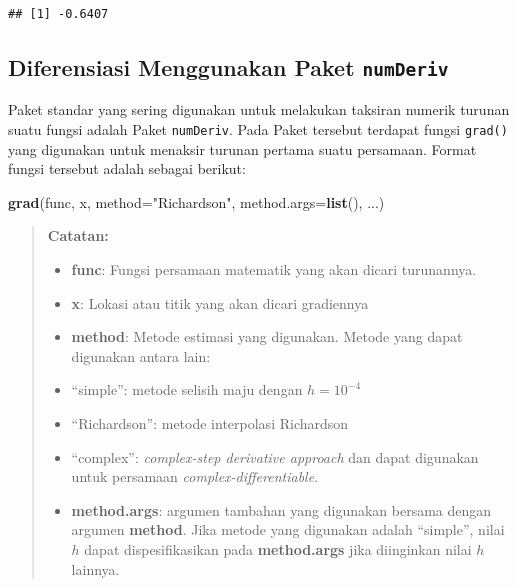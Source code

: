 \documentclass[
]{book}
\newenvironment{Shaded}{\begin{snugshade}}{\end{snugshade}}
\newcommand{\AttributeTok}[1]{\textcolor[rgb]{0.13,0.29,0.53}{#1}}
\newcommand{\FunctionTok}[1]{\textcolor[rgb]{0.13,0.29,0.53}{\textbf{#1}}}
\newcommand{\NormalTok}[1]{#1}
\newcommand{\StringTok}[1]{\textcolor[rgb]{0.31,0.60,0.02}{#1}}
\providecommand{\tightlist}{%
  \setlength{\itemsep}{0pt}\setlength{\parskip}{0pt}}
\theoremstyle{definition}
\theoremstyle{definition}
\theoremstyle{definition}
\theoremstyle{definition}
\theoremstyle{remark}
\begin{document}
\begin{verbatim}
## [1] -0.6407
\end{verbatim}

\hypertarget{diferensiasi-menggunakan-paket-numderiv}{%
\subsection{\texorpdfstring{Diferensiasi Menggunakan Paket \texttt{numDeriv}}{Diferensiasi Menggunakan Paket numDeriv}}\label{diferensiasi-menggunakan-paket-numderiv}}

Paket standar yang sering digunakan untuk melakukan taksiran numerik turunan suatu fungsi adalah Paket \texttt{numDeriv}. Pada Paket tersebut terdapat fungsi \texttt{grad()} yang digunakan untuk menaksir turunan pertama suatu persamaan. Format fungsi tersebut adalah sebagai berikut:

\begin{Shaded}
\begin{Highlighting}[]
\FunctionTok{grad}\NormalTok{(func, x, }\AttributeTok{method=}\StringTok{"Richardson"}\NormalTok{, }\AttributeTok{method.args=}\FunctionTok{list}\NormalTok{(), ...)}
\end{Highlighting}
\end{Shaded}

\begin{quote}
\textbf{Catatan:}

\begin{itemize}
\tightlist
\item
  \textbf{func}: Fungsi persamaan matematik yang akan dicari turunannya.
\item
  \textbf{x}: Lokasi atau titik yang akan dicari gradiennya
\item
  \textbf{method}: Metode estimasi yang digunakan. Metode yang dapat digunakan antara lain:
\item
  ``simple'': metode selisih maju dengan \(h = 10^{-4}\)
\item
  ``Richardson'': metode interpolasi Richardson
\item
  ``complex'': \emph{complex-step derivative approach} dan dapat digunakan untuk persamaan \emph{complex-differentiable}.
\item
  \textbf{method.args}: argumen tambahan yang digunakan bersama dengan argumen \textbf{method}. Jika metode yang digunakan adalah ``simple'', nilai \(h\) dapat dispesifikasikan pada \textbf{method.args} jika diinginkan nilai \(h\) lainnya.
\end{itemize}
\end{quote}
\end{document}
